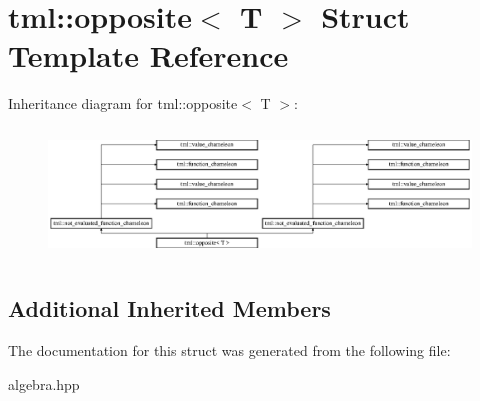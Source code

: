 \hypertarget{structtml_1_1opposite}{\section{tml\+:\+:opposite$<$ T $>$ Struct Template Reference}
\label{structtml_1_1opposite}
}
Inheritance diagram for tml\+:\+:opposite$<$ T $>$\+:\begin{figure}[H]
\begin{center}
\leavevmode
\includegraphics[height=3.500000cm]{structtml_1_1opposite}
\end{center}
\end{figure}
\subsection*{Additional Inherited Members}


The documentation for this struct was generated from the following file\+:\begin{DoxyCompactItemize}
\item 
algebra.\+hpp\end{DoxyCompactItemize}
